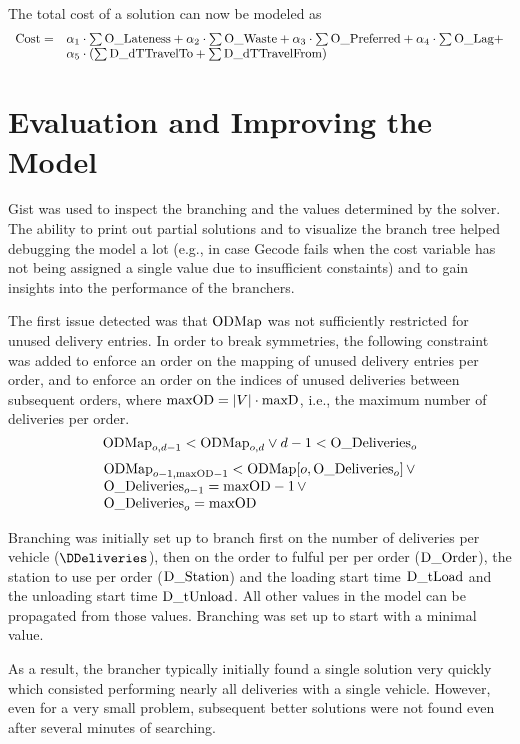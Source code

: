 \documentclass[a4paper]{article}
\begin{document}
The total cost of a solution can now be modeled as
\[
\begin{array}{l l}
\text{Cost} = & \alpha_1 \cdot \sum \text{O\_Lateness} + \alpha_2 \cdot \sum \text{O\_Waste} + \alpha_3 \cdot \sum \text{O\_Preferred} + \alpha_4 \cdot \sum \text{O\_Lag} + \\
              & \alpha_5 \cdot (\sum \text{D\_dTTravelTo} + \sum \text{D\_dTTravelFrom})
\end{array}
\]


\section{Evaluation and Improving the Model}

Gist was used to inspect the branching and the values determined by the solver. The ability to print out partial
solutions and to visualize the branch tree helped debugging the model a lot (e.g., in case Gecode fails when the cost
variable has not being assigned a single value due to insufficient constaints) and to gain insights into the performance of
the branchers.

\newcommand{\maxOD}{\text{maxOD}}

The first issue detected was that $\text{ODMap}$ was not sufficiently restricted for unused delivery entries. In order to break symmetries, the following constraint
was added to enforce an order on the mapping of unused delivery entries per order, and to enforce an order on the
indices of unused deliveries between subsequent orders, where $\maxOD = |V| \cdot \maxD$, i.e., the maximum number
of deliveries per order.
\[
\text{ODMap}_{o,d-1} < \text{ODMap}_{o,d} \vee d-1 < \text{O\_Deliveries}_o
\]
\[
\begin{array}{l}
\ODMap_{o-1,\maxOD - 1} < \ODMap[o, \ODeliveries_o] \, \vee \\
\ODeliveries_{o-1} = \maxOD - 1 \, \vee \\
\ODeliveries_o = \maxOD
\end{array}
\]

Branching was initially set up to branch first on the number of deliveries per vehicle ($\DDeliveries$), then on the order to fulful per
per order ($\text{D\_Order}$), the station to use per order ($\text{D\_Station}$) and the loading start time $\text{D\_tLoad}$ and the unloading
start time $\text{D\_tUnload}$. All other values in the model can be propagated from those values. Branching was set up to start
with a minimal value.

As a result, the brancher typically initially found a single solution very quickly which consisted performing nearly all
deliveries with a single vehicle. However, even for a very small problem, subsequent better solutions were not found
even after several minutes of searching. 
\end{document}
